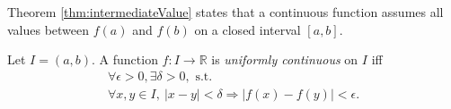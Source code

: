 \begin{rem}
Theorem \ref{thm:intermediateValue}
 states that a continuous function assumes
 all values between $f(a)$ and $f(b)$
 on a closed interval $[a,b]$.
\end{rem}

\begin{defn}
  \label{def:uniformlyContinuousScalar}
  Let $I=(a,b)$. A function $f: I\rightarrow \mathbb{R}$
  is \emph{uniformly continuous} on $I$
  iff
   \begin{equation}
     \label{eq:uniformlyContinuousScalar}
     \begin{array}{l}
     \forall \epsilon>0, \exists \delta>0,\text{ s.t. }
     \\
     \forall x,y\in I,\ 
     |x-y|<\delta \Rightarrow |f(x)-f(y)|<\epsilon.
     \end{array}
   \end{equation}
\end{defn}

